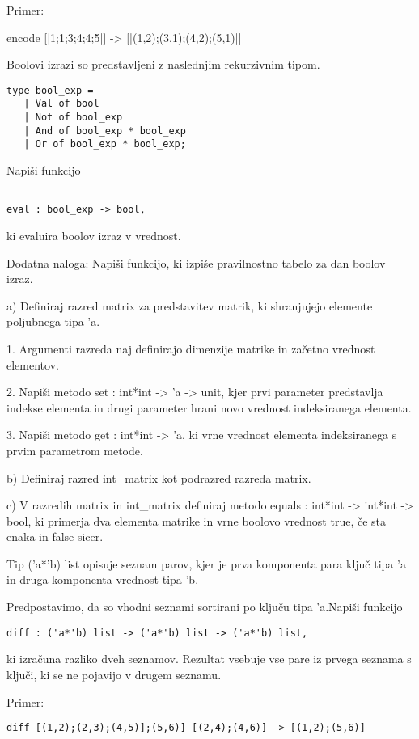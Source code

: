 \begin{ex}
Primer:

encode [|1;1;3;4;4;5|] -> [|(1,2);(3,1);(4,2);(5,1)|]


\end{ex} \begin{ex}
Boolovi izrazi so predstavljeni z naslednjim rekurzivnim tipom.   

\begin{verbatim}
type bool_exp =
   | Val of bool
   | Not of bool_exp
   | And of bool_exp * bool_exp
   | Or of bool_exp * bool_exp;

\end{verbatim}
Napi\v si funkcijo
\begin{verbatim}

eval : bool_exp -> bool, 
\end{verbatim}

ki evaluira boolov izraz v vrednost.   

Dodatna naloga: Napi\v si funkcijo, ki izpi\v se pravilnostno tabelo
za dan boolov izraz.


\end{ex} 
\begin{ex} 
  a) Definiraj razred matrix za predstavitev matrik, ki shranjujejo
  elemente poljubnega tipa 'a.

  1. Argumenti razreda naj definirajo dimenzije matrike in za\v cetno
  vrednost elementov.

  2. Napi\v si metodo set : int*int -> 'a -> unit, kjer prvi parameter
  predstavlja indekse elementa in drugi parameter hrani novo vrednost
  indeksiranega elementa.

  3. Napi\v si metodo get : int*int -> 'a, ki vrne vrednost elementa
  indeksiranega s prvim parametrom metode.
       
  b) Definiraj razred int\_matrix kot podrazred razreda matrix.

  c) V razredih matrix in int\_matrix definiraj metodo equals :
  int*int -> int*int -> bool, ki primerja dva elementa matrike in vrne
  boolovo vrednost true, \v ce sta enaka in false sicer.


\end{ex} 
\begin{ex}
  Tip ('a*'b) list opisuje seznam parov, kjer je prva komponenta para
  klju\v c tipa 'a in druga komponenta vrednost tipa 'b.

  Predpostavimo, da so vhodni seznami sortirani po klju\v cu tipa
  'a.Napi\v si funkcijo

\begin{verbatim}
diff : ('a*'b) list -> ('a*'b) list -> ('a*'b) list,
\end{verbatim}

  ki izra\v cuna razliko dveh seznamov. Rezultat vsebuje vse pare iz
  prvega seznama s klju\v ci, ki se ne pojavijo v drugem seznamu.

\noindent\/Primer:    
\begin{verbatim}
diff [(1,2);(2,3);(4,5)];(5,6)] [(2,4);(4,6)] -> [(1,2);(5,6)]
\end{verbatim}


\end{ex} 
